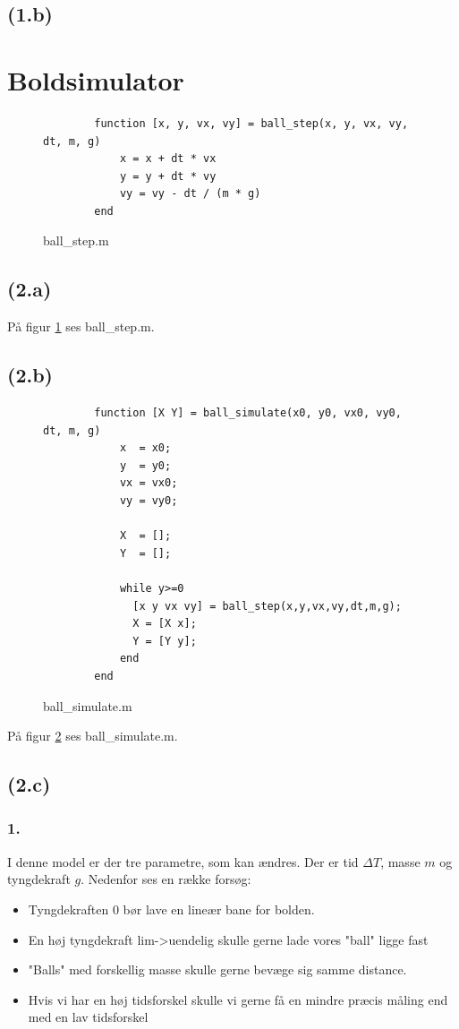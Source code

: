 \documentclass{article}
\begin{document}
\subsection*{(1.b)}

\section{Boldsimulator}

\begin{figure}
	\begin{verbatim}
		function [x, y, vx, vy] = ball_step(x, y, vx, vy, dt, m, g)
		    x = x + dt * vx
		    y = y + dt * vy
		    vy = vy - dt / (m * g)
		end
	\end{verbatim}
	\caption{ball\_step.m}
	\label{ballsinmyass}
\end{figure}

\subsection*{(2.a)}
På figur \ref{ballsinmyass} ses ball\_step.m.

\subsection*{(2.b)}
\begin{figure}
	\begin{verbatim}
		function [X Y] = ball_simulate(x0, y0, vx0, vy0, dt, m, g)
			x  = x0;
			y  = y0;
			vx = vx0;
			vy = vy0;

			X  = [];
			Y  = [];

			while y>=0
			  [x y vx vy] = ball_step(x,y,vx,vy,dt,m,g);
			  X = [X x];
			  Y = [Y y];
			end
		end
	\end{verbatim}
	\caption{ball\_simulate.m}
	\label{ballsims}
\end{figure}

På figur \ref{ballsims} ses ball\_simulate.m.

\subsection*{(2.c)}

\subsubsection*{1.}

I denne model er der tre parametre, som kan ændres. Der er tid $\Delta T$, masse $m$ og tyngdekraft $g$. Nedenfor ses en række forsøg:
\begin{itemize}
	\item Tyngdekraften 0 bør lave en lineær bane for bolden.
	\item En høj tyngdekraft lim->uendelig skulle gerne lade vores "ball" ligge fast
	\item "Balls" med forskellig masse skulle gerne bevæge sig samme distance.
	\item Hvis vi har en høj tidsforskel skulle vi gerne få en mindre præcis måling end med en lav tidsforskel
\end{itemize}
\end{document}
